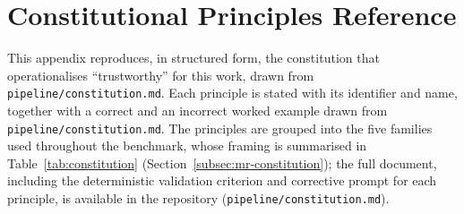 \appendix
\renewcommand{\thechapter}{A\arabic{chapter}}

\chapter{Constitutional Principles Reference}
\label{chap:constitutional-principles-reference}

This appendix reproduces, in structured form, the constitution that operationalises ``trustworthy'' for this work, drawn from \texttt{pipeline/constitution.md}. Each principle is stated with its identifier and name, together with a correct and an incorrect worked example drawn from \texttt{pipeline/constitution.md}. The principles are grouped into the five families used throughout the benchmark, whose framing is summarised in Table~\ref{tab:constitution} (Section~\ref{subsec:mr-constitution}); the full document, including the deterministic validation criterion and corrective prompt for each principle, is available in the repository (\texttt{pipeline/constitution.md}).

